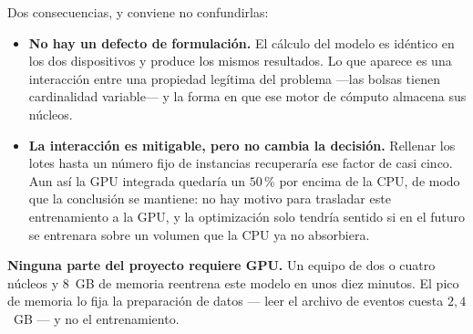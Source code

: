 \documentclass[11pt,a4paper]{article}
\begin{document}
\begin{bloquenuevo}
Dos consecuencias, y conviene no confundirlas:

\begin{itemize}
  \item \textbf{No hay un defecto de formulación.} El cálculo del modelo es idéntico en los dos
        dispositivos y produce los mismos resultados. Lo que aparece es una interacción entre
        una propiedad legítima del problema ---las bolsas tienen cardinalidad variable--- y la
        forma en que ese motor de cómputo almacena sus núcleos.
  \item \textbf{La interacción es mitigable, pero no cambia la decisión.} Rellenar los lotes
        hasta un número fijo de instancias recuperaría ese factor de casi cinco. Aun así la
        GPU integrada quedaría un $50$\,\% por encima de la CPU, de modo que la conclusión
        se mantiene: no hay motivo para trasladar este entrenamiento a la GPU, y la
        optimización solo tendría sentido si en el futuro se entrenara sobre un volumen que la
        CPU ya no absorbiera.
\end{itemize}
\end{bloquenuevo}

\textbf{Ninguna parte del proyecto requiere GPU.} Un equipo de dos o cuatro núcleos y 8~GB de
memoria reentrena este modelo en unos diez minutos. El pico de memoria lo fija la preparación de
datos --- leer el archivo de eventos cuesta $2{,}4$~GB --- y no el entrenamiento.
\end{document}
